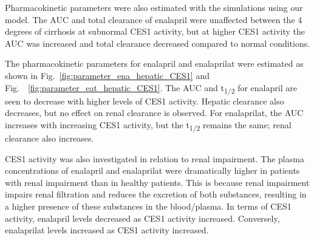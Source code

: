 \documentclass[pharmaceutics,article,submit,pdftex,moreauthors]{Definitions/mdpi}
\begin{document}
Pharmacokinetic parameters were also estimated with the simulations using our model. The AUC and total clearance of enalapril were unaffected between the 4 degrees of cirrhosis at subnormal CES1 activity, but at higher CES1 activity the AUC was increased and total clearance decreased compared to normal conditions.


The pharmacokinetic parameters for enalapril and enalaprilat were estimated as shown in Fig.~\ref{fig:parameter_ena_hepatic_CES1} and Fig.~~\ref{fig:parameter_eat_hepatic_CES1}. The AUC and t\textsubscript{1/2} for enalapril are seen to decrease with higher levels of CES1 activity. Hepatic clearance also decreases, but no effect on renal clearance is observed. For enalaprilat, the AUC increases with increasing CES1 activity, but the t\textsubscript{1/2} remains the same; renal clearance also increases.


CES1 activity was also investigated in relation to renal impairment. The plasma concentrations of enalapril and enalaprilat were dramatically higher in patients with renal impairment than in healthy patients. This is because renal impairment impairs renal filtration and reduces the excretion of both substances, resulting in a higher presence of these substances in the blood/plasma. In terms of CES1 activity, enalapril levels decreased as CES1 activity increased. Conversely, enalaprilat levels increased as CES1 activity increased.
\end{document}
